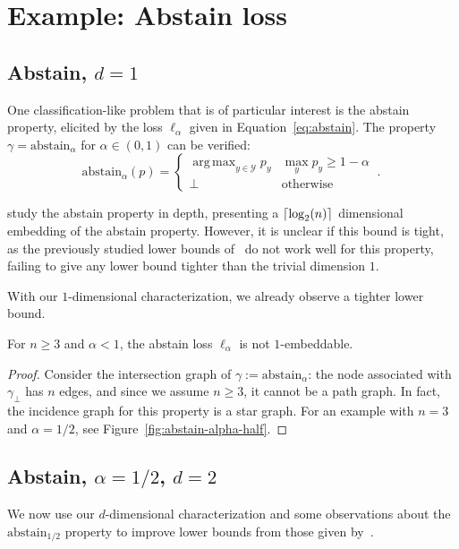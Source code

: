 \documentclass[anon]{colt2020} %
\newcommand{\abstain}[1]{\mathrm{abstain}_{#1}}
\newcommand{\Y}{\mathcal{Y}}
\newcommand{\ellabs}[1]{\ell_{#1}}
\DeclarePairedDelimiter\ceil{\lceil}{\rceil}
\DeclareMathOperator*{\argmax}{arg\,max}
\begin{document}
\section{Example: Abstain loss}\label{sec:examples}
\subsection{Abstain, $d=1$}\label{subsec:abstain-d1}
One classification-like problem that is of particular interest is the abstain property, elicited by the loss $\ellabs{\alpha}$ given in Equation~\eqref{eq:abstain}.
The property $\gamma = \abstain{\alpha}$ for $\alpha \in (0,1)$ can be verified:
\begin{equation}\label{eq:abstain-prop}
     \abstain{\alpha}(p) = \begin{cases}
     \argmax_{y \in \Y} p_y & \max_y p_y \geq 1 - \alpha\\
     \bot & \text{otherwise}
     \end{cases}~.~
\end{equation}

\cite{ramaswamy2018consistent} study the abstain property in depth, presenting a $\ceil {\log_2(n)}$ dimensional embedding of the abstain property.
However, it is unclear if this bound is tight, as the previously studied lower bounds of~\cite{ramaswamy2016convex} do not work well for this property, failing to give any lower bound tighter than the trivial dimension $1$.

With our $1$-dimensional characterization, we already observe a tighter lower bound.
\begin{proposition}
	For $n \geq 3$ and $\alpha < 1$, the abstain loss $\ell_{\alpha}$ is not $1$-embeddable.
\end{proposition}
\begin{proof}
	Consider the intersection graph of $\gamma := \abstain{\alpha}$: the node associated with $\gamma_\bot$ has $n$ edges, and since we assume $n \geq 3$, it cannot be a path graph.
	In fact, the incidence graph for this property is a star graph.
	For an example with $n=3$ and $\alpha = 1/2$, see Figure~\ref{fig:abstain-alpha-half}.
\end{proof}

\subsection{Abstain, $\alpha = 1/2$, $d=2$}
We now use our $d$-dimensional characterization and some observations about the $\abstain{1/2}$ property to improve lower bounds from those given by~\cite{ramaswamy2016convex}.
\end{document}
